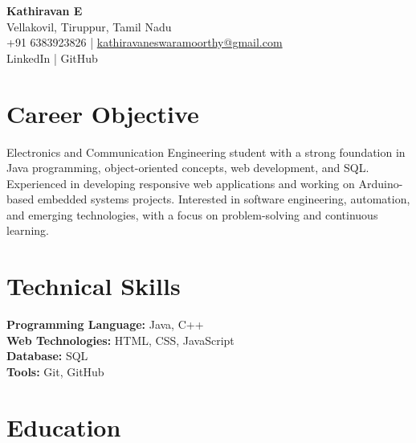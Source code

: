 \documentclass[10pt,a4paper]{article}
\begin{document}

\begin{center}

    {\LARGE \textbf{Kathiravan E}}\\[4pt]

    Vellakovil, Tiruppur, Tamil Nadu\\[3pt]

    +91 6383923826
    \quad | \quad
    \href{mailto:kathiravaneswaramoorthy@gmail.com}
    {kathiravaneswaramoorthy@gmail.com}\\[3pt]

    LinkedIn \quad | \quad GitHub

\end{center}


\section*{Career Objective}

Electronics and Communication Engineering student with a strong foundation in Java programming, object-oriented concepts, web development, and SQL. Experienced in developing responsive web applications and working on Arduino-based embedded systems projects. Interested in software engineering, automation, and emerging technologies, with a focus on problem-solving and continuous learning.


\section*{Technical Skills}

\textbf{Programming Language:} Java, C++\\
\textbf{Web Technologies:} HTML, CSS, JavaScript\\
\textbf{Database:} SQL\\
\textbf{Tools:} Git, GitHub


\section*{Education}
\end{document}
